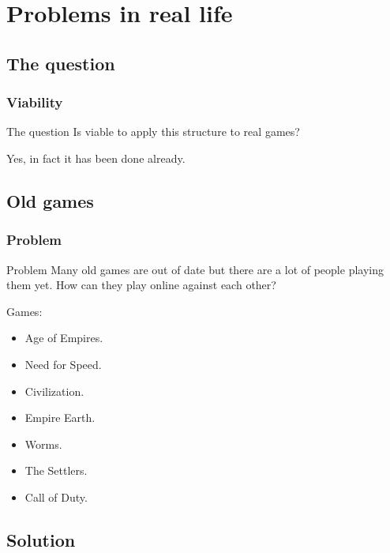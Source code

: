 \documentclass{beamer}
\begin{document}
\section{Problems in real life}

\subsection{The question}
\begin{frame}
	\frametitle{Viability}
	\begin{block}{The question}
		Is viable to apply this structure to real games? 
	\end{block}
	\pause
	Yes, in fact it has been done already.
\end{frame}

\subsection{Old games}
\begin{frame}
	\frametitle{Problem}
	\begin{block}{Problem}
		Many old games are out of date but there are a lot of people playing them yet. How can they play online against each other?
	\end{block}
	Games:
	\begin{itemize}
		\item Age of Empires.
		\item Need for Speed.
		\item Civilization.
		\item Empire Earth.
		\item Worms.
		\item The Settlers.
		\item Call of Duty.
	\end{itemize}
\end{frame}

\subsection{Solution}
\end{document}
